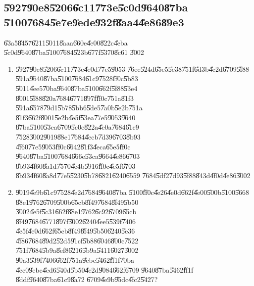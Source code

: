 \documentclass[12pt,a4paper]{article}
\begin{document}
\subsection{\U{5927}\U{90e8}\U{5206}\U{6c11}\U{773e}\U{5c0d}\U{9640}\U{87ba}%
\U{5100}\U{7684}\U{5e7e}\U{9ede}\U{932f}\U{8aa4}\U{4e86}\U{89e3}}

\U{63a5}\U{8457}\U{6211}\U{5011}\U{8aaa}\U{660e}\U{4e00}\U{822c}\U{4eba}%
\U{5c0d}\U{9640}\U{87ba}\U{5100}\U{7684}\U{523b}\U{677f}\U{5370}\U{8c61}%
\U{3002}

\begin{enumerate}
\item \U{5927}\U{90e8}\U{5206}\U{6c11}\U{773e}\U{4e0d}\U{77e5}\U{9053}%
\U{76ee}\U{524d}\U{65e5}\U{5e38}\U{751f}\U{6d3b}\U{4e2d}\U{6709}\U{5f88}%
\U{591a}\U{9640}\U{87ba}\U{5100}\U{7684}\U{61c9}\U{7528}\U{ff0c}\U{5b83}%
\U{5011}\U{4ee5}\U{70ba}\U{9640}\U{87ba}\U{5100}\U{662f}\U{5f88}\U{53e4}%
\U{8001}\U{5f88}\U{820a}\U{7684}\U{6771}\U{897f}\U{ff0c}\U{751a}\U{81f3}%
\U{591a}\U{6578}\U{79d1}\U{5b78}\U{5bb6}\U{5de5}\U{7a0b}\U{5e2b}\U{751a}%
\U{81f3}\U{662f}\U{8001}\U{5e2b}\U{4e5f}\U{53ea}\U{77e5}\U{9053}\U{9640}%
\U{87ba}\U{5100}\U{53ea}\U{6709}\U{5c0e}\U{822a}\U{4e0a}\U{7684}\U{61c9}%
\U{7528}\U{3002}\U{9019}\U{88e1}\U{7684}\U{4ecb}\U{7d39}\U{6703}\U{8b93}%
\U{4f60}\U{77e5}\U{9053}\U{ff0c}\U{6642}\U{81f3}\U{4eca}\U{65e5}\U{ff0c}%
\U{9640}\U{87ba}\U{5100}\U{7684}\U{666e}\U{53ca}\U{9664}\U{4e86}\U{6703}%
\U{8b93}\U{4f60}\U{8a1d}\U{7570}\U{4e4b}\U{5916}\U{ff0c}\U{4e5f}\U{6703}%
\U{8b93}\U{4f60}\U{8a8d}\U{77e5}\U{5230}\U{5b78}\U{6821}\U{6240}\U{6559}%
\U{7684}\U{5df2}\U{7d93}\U{5f88}\U{843d}\U{4f0d}\U{4e86}\U{3002}

\item \U{9019}\U{4e9b}\U{61c9}\U{7528}\U{4e2d}\U{7684}\U{9640}\U{87ba}%
\U{5100}\U{ff0c}\U{4e26}\U{4e0d}\U{662f}\U{4e00}\U{500b}\U{5100}\U{5668}%
\U{88e1}\U{9762}\U{6709}\U{500b}\U{65cb}\U{8f49}\U{7684}\U{8f49}\U{5b50}%
\U{3002}\U{4e5f}\U{5c31}\U{662f}\U{88e1}\U{9762}\U{6c92}\U{6709}\U{65cb}%
\U{8f49}\U{7684}\U{6771}\U{897f}\U{3002}\U{6240}\U{4ee5}\U{539f}\U{7406}%
\U{4e5f}\U{4e0d}\U{662f}\U{65cb}\U{8f49}\U{8f49}\U{5b50}\U{6240}\U{5e36}%
\U{4f86}\U{7684}\U{89d2}\U{52d5}\U{91cf}\U{5b88}\U{6046}\U{800c}\U{7522}%
\U{751f}\U{7684}\U{5b9a}\U{8ef8}\U{6216}\U{5b9a}\U{5411}\U{6027}\U{3002}%
\U{90a3}\U{539f}\U{7406}\U{662f}\U{751a}\U{9ebc}\U{5462}\U{ff1f}\U{70ba}%
\U{4ec0}\U{9ebc}\U{4ed6}\U{540d}\U{5b50}\U{4e2d}\U{9084}\U{662f}\U{6709}%
\U{9640}\U{87ba}\U{5462}\U{ff1f} \U{8ddf}\U{9640}\U{87ba}\U{61c9}\U{8a72}%
\U{6709}\U{4e9b}\U{95dc}\U{4fc2}\U{5427}?


\end{enumerate}
\end{document}
